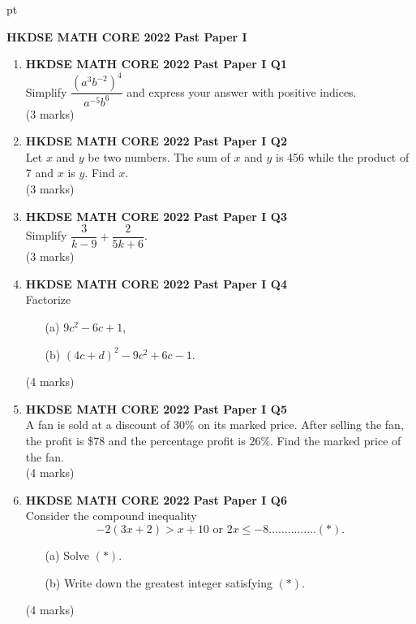 \documentclass[12pt]{article}
\begin{document}
 pt
\begin{center}
	{\large \bf HKDSE MATH CORE 2022 Past Paper I}\\
	\vspace{2 mm}

\end{center}
\vspace{0.05cm}

\begin{enumerate}
	\item \textbf{HKDSE MATH CORE 2022 Past Paper I Q1}\\
	Simplify $\dfrac{(a^3b^{-2})^4}{a^{-5}b^6}$ and express your answer with positive indices. \\(3 marks)	
	
	\item \textbf{HKDSE MATH CORE 2022 Past Paper I Q2}\\
	Let $x$ and $y$ be two numbers. The sum of $x$ and $y$ is 456 while the product of 7 and $x$ is $y$. Find $x$. \\(3 marks)

	\item \textbf{HKDSE MATH CORE 2022 Past Paper I Q3}\\
	Simplify $\dfrac{3}{k - 9} + \dfrac{2}{5k + 6}$. \\(3 marks)

	\item \textbf{HKDSE MATH CORE 2022 Past Paper I Q4}\\
	Factorize
	\begin{enumerate}
		\item[(a)] $9c^2 - 6c + 1$,
		\item[(b)] $(4c + d)^2 - 9c^2 + 6c - 1$.
	\end{enumerate}
	(4 marks)

	\item \textbf{HKDSE MATH CORE 2022 Past Paper I Q5}\\
	A fan is sold at a discount of 30\% on its marked price. After selling the fan, the profit is \$78 and the percentage profit is 26\%. Find the marked price of the fan. \\(4 marks)

	\item \textbf{HKDSE MATH CORE 2022 Past Paper I Q6}\\
	Consider the compound inequality $$-2(3x + 2) > x + 10 \text{ or } 2x \leq -8 \dots\dots\dots\dots\dots (*) .$$
	\begin{enumerate}
		\item[(a)] Solve $(*)$.
		\item[(b)] Write down the greatest integer satisfying $(*)$.	
	\end{enumerate}
	(4 marks)


\end{enumerate}
\end{document}
